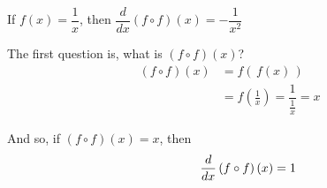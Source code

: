 \documentclass[14pt,fleqn]{extarticle}
\begin{document}
 
\begin{snippet}
    
    \incorrect
    
    If $f(x) = \dfrac{1}{x}$, then $\dfrac{d}{dx} \left(f\circ f \right)(x) = -\dfrac{1}{x^2}$ 
    \reason
    
    The first question is, what is $\left(f\circ f \right)(x)$? 
    \begin{align}
	   \left(f\circ f \right)(x) &= f \left(\, f(x) \,\right) \\
	   &= f \left(\frac{1}{x} \right) = \dfrac{1}{\frac{1}{x}} = x 
\end{align}

And so, if $ \left(f\circ f \right)(x) = x$, then 
\[ \quad\qquad \frac{d}{dx} \left(f\circ f \right)(x) = 1 \]
    
\end{snippet} 
\end{document}
